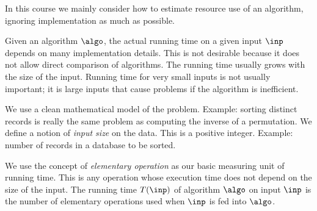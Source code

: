In this course we mainly consider how to estimate resource use of an algorithm, 
ignoring implementation as much as possible.  



Given an algorithm $\algo$, the actual running time on a given
input $\inp$ depends on many implementation details. This is not desirable
because it does not allow direct comparison of algorithms. 
The running time usually grows with the size of the input.
Running time for very small inputs is not usually important; it is large
inputs that cause problems if the algorithm is inefficient. 


We use a clean mathematical model of the problem. Example: sorting 
distinct records is really the same problem as computing the inverse of a 
permutation. We define a notion of  \emph{input size} on the data. This is a positive integer. 
Example: number of records in a database to be sorted.

We use the concept of \emph{elementary operation} as our basic measuring 
unit of running time. This is any operation whose execution time does not depend on the size of the input.
The running time $T(\inp)$ of algorithm $\algo$ on input $\inp$ is the 
number of elementary operations used when $\inp$ is fed into $\algo$.





